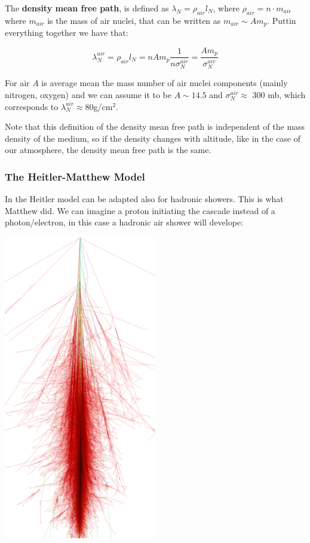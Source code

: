 \documentclass[
  letterpaper,
  DIV=11,
  numbers=noendperiod]{scrreprt}
\begin{document}
The \textbf{density mean free path}, is defined as
\(\lambda_N = \rho_{air} l_N\), where \(\rho_{air} = n \cdot m_{air}\)
where \(m_{air}\) is the mass of air nuclei, that can be written as
\(m_{air} \sim A m_p\). Puttin everything together we have that:

\[\lambda^{air}_N = \rho_{air} l_N = n A m_p\frac{1}{n\sigma_N^{air}} = \frac{A m_{p}}{\sigma_N^{air}}\]

For air \(A\) is average mean the mass number of air nuclei components
(mainly nitrogen, oxygen) and we can assume it to be \(A \sim 14.5\) and
\(\sigma_N^{air} \approx\) 300 mb, which corresponds to
\(\lambda_N^{air} \approx 80\)g/cm\(^{2}\).

Note that this definition of the density mean free path is independent
of the mass density of the medium, so if the density changes with
altitude, like in the case of our atmosphere, the density mean free path
is the same.

\subsubsection{The Heitler-Matthew
Model}\label{the-heitler-matthew-model}

In the Heitler model can be adapted also for hadronic showers. This is
what Matthew did. We can imagine a proton initiating the cascade instead
of a photon/electron, in this case a hadronic air shower will develope:

\begin{center}
\includegraphics[width=0.5\textwidth,height=\textheight]{images/proton_eas.png}
\end{center}
\end{document}
